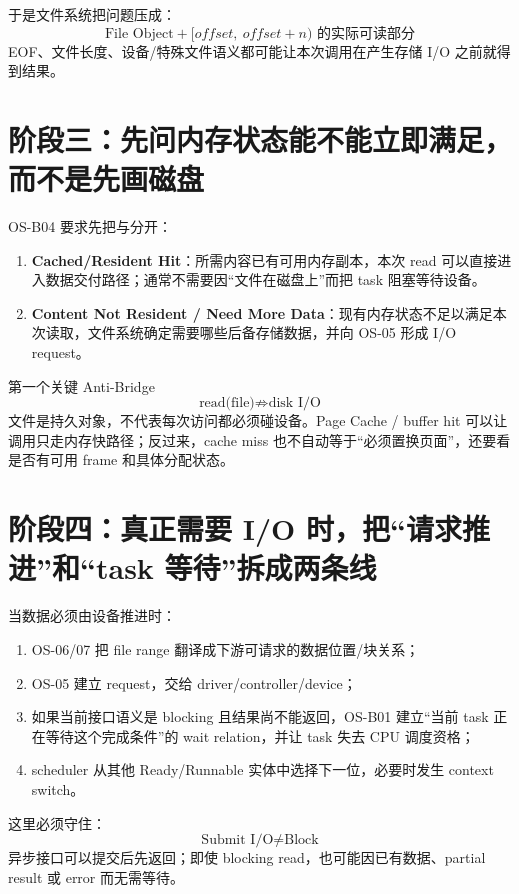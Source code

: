 \documentclass[UTF8,fontset=none,11pt,a4paper]{ctexart}
\begin{document}
于是文件系统把问题压成：
\[
\boxed{\text{File Object} + [offset,\ offset+n)\text{ 的实际可读部分}}
\]
EOF、文件长度、设备/特殊文件语义都可能让本次调用在产生存储 I/O 之前就得到结果。

\section{阶段三：先问内存状态能不能立即满足，而不是先画磁盘}

OS-B04 要求先把与分开：

\begin{enumerate}
  \item \textbf{Cached/Resident Hit}：所需内容已有可用内存副本，本次 read 可以直接进入数据交付路径；通常不需要因“文件在磁盘上”而把 task 阻塞等待设备。
  \item \textbf{Content Not Resident / Need More Data}：现有内存状态不足以满足本次读取，文件系统确定需要哪些后备存储数据，并向 OS-05 形成 I/O request。
\end{enumerate}

\begin{warnbox}{第一个关键 Anti-Bridge}
\[
\boxed{\text{read(file)} \not\Rightarrow \text{disk I/O}}
\]
文件是持久对象，不代表每次访问都必须碰设备。Page Cache / buffer hit 可以让调用只走内存快路径；反过来，cache miss 也不自动等于“必须置换页面”，还要看是否有可用 frame 和具体分配状态。
\end{warnbox}

\section{阶段四：真正需要 I/O 时，把“请求推进”和“task 等待”拆成两条线}

当数据必须由设备推进时：
\begin{enumerate}
  \item OS-06/07 把 file range 翻译成下游可请求的数据位置/块关系；
  \item OS-05 建立 request，交给 driver/controller/device；
  \item 如果当前接口语义是 blocking 且结果尚不能返回，OS-B01 建立“当前 task 正在等待这个完成条件”的 wait relation，并让 task 失去 CPU 调度资格；
  \item scheduler 从其他 Ready/Runnable 实体中选择下一位，必要时发生 context switch。
\end{enumerate}

这里必须守住：
\[
\boxed{\text{Submit I/O} \neq \text{Block}}
\]
异步接口可以提交后先返回；即使 blocking read，也可能因已有数据、partial result 或 error 而无需等待。
\end{document}
